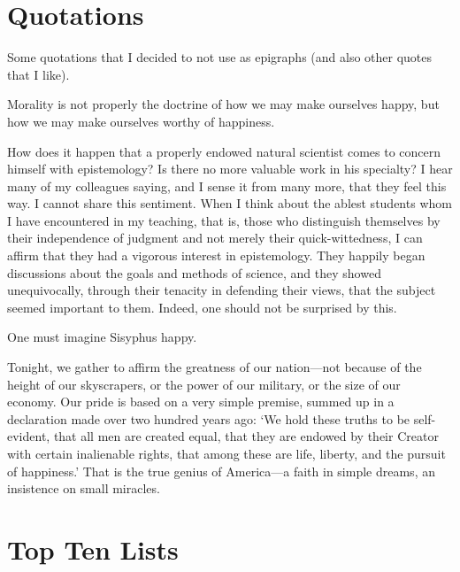 \documentclass[../butidigress.tex]{subfiles}
\begin{document}
\chapter{Quotations}
\newpage
Some quotations that I decided to not use as epigraphs (and also other quotes that I like).
\par
\epigraph{Morality is not properly the doctrine of how we may make ourselves happy, but how we may make ourselves worthy of happiness.}{}
\postepi
\epigraph{How does it happen that a properly endowed natural scientist comes to concern himself with epistemology? Is there no more valuable work in his specialty? I hear many of my colleagues saying, and I sense it from many more, that they feel this way. I cannot share this sentiment. When I think about the ablest students whom I have encountered in my teaching, that is, those who distinguish themselves by their independence of judgment and not merely their quick-wittedness, I can affirm that they had a vigorous interest in epistemology. They happily began discussions about the goals and methods of science, and they showed unequivocally, through their tenacity in defending their views, that the subject seemed important to them. Indeed, one should not be surprised by this.}{}
\postepi
\epigraph{One must imagine Sisyphus happy.}{}
\postepi
\epigraph{Tonight, we gather to affirm the greatness of our nation---not because of the height of our skyscrapers, or the power of our military, or the size of our economy. Our pride is based on a very simple premise, summed up in a declaration made over two hundred years ago: `We hold these truths to be self-evident, that all men are created equal, that they are endowed by their Creator with certain inalienable rights, that among these are life, liberty, and the pursuit of happiness.' That is the true genius of America---a faith in simple dreams, an insistence on small miracles.}{}
\postepi

\chapter{Top Ten Lists}
\newpage
\end{document}
